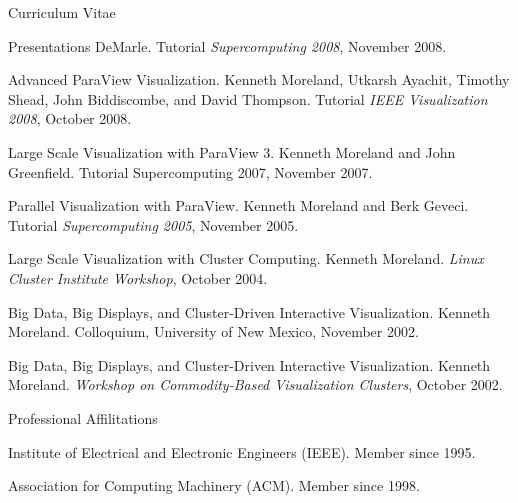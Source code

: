 \documentclass{article}
\begin{document}
\begin{cv}{Curriculum Vitae}
\begin{cvlist}{Presentations}
      DeMarle. Tutorial \emph{Supercomputing 2008}, November 2008.
    \item[Advanced ParaView Visualization.] Kenneth Moreland, Utkarsh
      Ayachit, Timothy Shead, John Biddiscombe, and David
      Thompson. Tutorial \emph{IEEE Visualization 2008}, October 2008.
    \item[Large Scale Visualization with ParaView 3.] Kenneth Moreland and
      John Greenfield. Tutorial Supercomputing 2007, November 2007.
    \item[Parallel Visualization with ParaView.] Kenneth Moreland and Berk
      Geveci. Tutorial \emph{Supercomputing 2005}, November 2005.
    \item[Large Scale Visualization with Cluster Computing.] Kenneth
      Moreland. \emph{Linux Cluster Institute Workshop}, October 2004.
    \item[Big Data, Big Displays, and Cluster-Driven Interactive
      Visualization.] Kenneth Moreland. Colloquium, University of New
      Mexico, November 2002.
    \item[Big Data, Big Displays, and Cluster-Driven Interactive
      Visualization.] Kenneth Moreland. \emph{Workshop on Commodity-Based
      Visualization Clusters}, October 2002.
    \end{cvlist}

    \begin{cvlist}{Professional Affilitations}
    \item Institute of Electrical and Electronic Engineers (IEEE).
      Member since 1995.
    \item Association for Computing Machinery (ACM).  Member since 1998.
    \end{cvlist}

  \end{cv}
\end{document}
